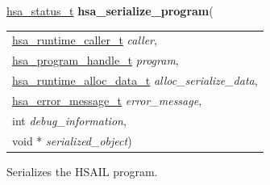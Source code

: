 \documentclass[final]{book}
\newcommand{\hsaarg}[1]{\textit{#1}}
\begin{document}
\begin{appendices}
\noindent\begin{tcolorbox}[breakable,nobeforeafter,colframe=white,colback=lightgray,left=0mm]
\hyperlink{group--status-1gad755322e7ff95456520e8abdbe90d225}{hsa_status_t} \hypertarget{group--HsailLinkerServiceLayer-1ga951f5c8d0133ef67a31c3d0a7308df28}{\textbf{hsa_serialize_program}}(
\vspace{-3.5mm}\begin{longtable}{@{}p{\textwidth}}
\hspace{1.7em}\hyperlink{group--RuntimeCommon-1ga7d9b1191602415f5dd3893985cc93826}{hsa_runtime_caller_t} \hsaarg{caller},\\
\hspace{1.7em}\hyperlink{group--HsailLinkerServiceLayer-1ga7b28ca39da981be49aac99608eb386cb}{hsa_program_handle_t} \hsaarg{program},\\
\hspace{1.7em}\hyperlink{group--RuntimeCommon-1gabd2ff48bd8e2fec466eb5b561e07fec7}{hsa_runtime_alloc_data_t} \hsaarg{alloc_serialize_data},\\
\hspace{1.7em}\hyperlink{group--FinalizerCoreApi-1ga0105dcb4254850e0ec03d44fc54e11b8}{hsa_error_message_t} \hsaarg{error_message},\\
\hspace{1.7em}int \hsaarg{debug_information},\\
\hspace{1.7em}void * \hsaarg{serialized_object})\end{longtable}

\end{tcolorbox}
Serializes the HSAIL program.


\end{appendices}
\end{document}

